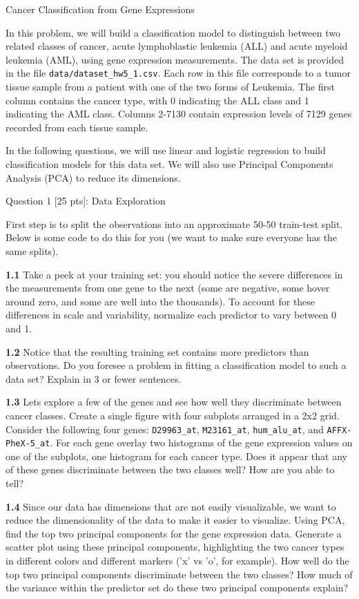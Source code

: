 \documentclass[11pt]{article}
\begin{document}
    Cancer Classification from Gene Expressions

In this problem, we will build a classification model to distinguish
between two related classes of cancer, acute lymphoblastic leukemia
(ALL) and acute myeloid leukemia (AML), using gene expression
measurements. The data set is provided in the file
\texttt{data/dataset\_hw5\_1.csv}. Each row in this file corresponds to
a tumor tissue sample from a patient with one of the two forms of
Leukemia. The first column contains the cancer type, with 0 indicating
the ALL class and 1 indicating the AML class. Columns 2-7130 contain
expression levels of 7129 genes recorded from each tissue sample.

In the following questions, we will use linear and logistic regression
to build classification models for this data set. We will also use
Principal Components Analysis (PCA) to reduce its dimensions.

     Question 1 {[}25 pts{]}: Data Exploration

First step is to split the observations into an approximate 50-50
train-test split. Below is some code to do this for you (we want to make
sure everyone has the same splits).

\textbf{1.1} Take a peek at your training set: you should notice the
severe differences in the measurements from one gene to the next (some
are negative, some hover around zero, and some are well into the
thousands). To account for these differences in scale and variability,
normalize each predictor to vary between 0 and 1.

\textbf{1.2} Notice that the resulting training set contains more
predictors than observations. Do you foresee a problem in fitting a
classification model to such a data set? Explain in 3 or fewer
sentences.

\textbf{1.3} Lets explore a few of the genes and see how well they
discriminate between cancer classes. Create a single figure with four
subplots arranged in a 2x2 grid. Consider the following four genes:
\texttt{D29963\_at}, \texttt{M23161\_at}, \texttt{hum\_alu\_at}, and
\texttt{AFFX-PheX-5\_at}. For each gene overlay two histograms of the
gene expression values on one of the subplots, one histogram for each
cancer type. Does it appear that any of these genes discriminate between
the two classes well? How are you able to tell?

\textbf{1.4} Since our data has dimensions that are not easily
visualizable, we want to reduce the dimensionality of the data to make
it easier to visualize. Using PCA, find the top two principal components
for the gene expression data. Generate a scatter plot using these
principal components, highlighting the two cancer types in different
colors and different markers ('x' vs 'o', for example). How well do the
top two principal components discriminate between the two classes? How
much of the variance within the predictor set do these two principal
components explain?
\end{document}
